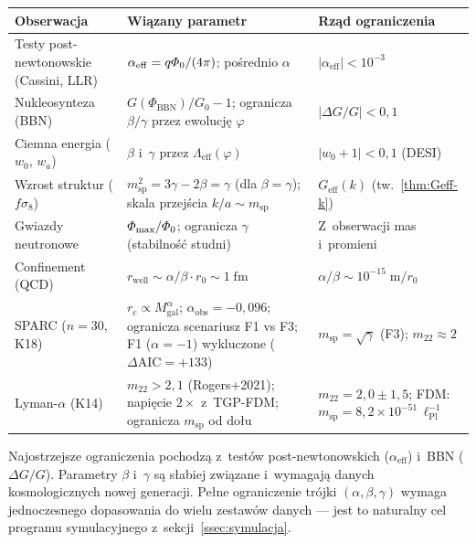 \begin{center}
\small
\begin{tabular}{@{}>{\raggedright}p{3cm}p{7cm}>{\raggedright\arraybackslash}p{3.5cm}@{}}
\toprule
\textbf{Obserwacja} & \textbf{Wi\k{a}zany parametr}
  & \textbf{Rz\k{a}d ograniczenia} \\
\midrule
Testy post-newtonowskie
  (Cassini, LLR)
  & $\alpha_{\mathrm{eff}} = q\varPhi_0/(4\pi)$;
    po\'srednio $\alpha$
  & $|\alpha_{\mathrm{eff}}| < 10^{-3}$ \\[4pt]
Nukleosynteza (BBN)
  & $G(\Phi_{\mathrm{BBN}})/G_0 - 1$;
    ogranicza $\beta/\gamma$ przez ewolucj\k{e} $\varphi$
  & $|\Delta G/G| < 0{,}1$ \\[4pt]
Ciemna energia
  ($w_0$, $w_a$)
  & $\beta$ i~$\gamma$ przez
    $\Lambda_{\mathrm{eff}}(\varphi)$
  & $|w_0 + 1| < 0{,}1$ (DESI) \\[4pt]
Wzrost struktur
  ($f\sigma_8$)
  & $m_{\mathrm{sp}}^2 = 3\gamma - 2\beta = \gamma$
    (dla $\beta = \gamma$);
    skala przej\'scia $k/a \sim m_{\mathrm{sp}}$
  & $G_{\mathrm{eff}}(k)$ (tw.~\ref{thm:Geff-k}) \\[4pt]
Gwiazdy neutronowe
  & $\varPhi_{\mathrm{max}}/\varPhi_0$; ogranicza
    $\gamma$ (stabilno\'s\'c studni)
  & Z~obserwacji mas i~promieni \\[4pt]
Confinement (QCD)
  & $r_{\mathrm{well}} \sim \alpha/\beta \cdot r_0
    \sim 1\;\mathrm{fm}$
  & $\alpha/\beta \sim 10^{-15}\;\mathrm{m}/r_0$ \\[4pt]
SPARC ($n=30$, K18)
  & $r_c \propto M_{\mathrm{gal}}^\alpha$;
    $\alpha_{\mathrm{obs}} = -0{,}096$;
    ogranicza scenariusz F1 vs F3;
    F1 ($\alpha=-1$) wykluczone ($\Delta\mathrm{AIC}=+133$)
  & $m_{\mathrm{sp}} = \sqrt{\gamma}$ (F3); $m_{22} \approx 2$ \\[4pt]
Lyman-$\alpha$ (K14)
  & $m_{22} > 2{,}1$ (Rogers+2021);
    napięcie $2\times$ z~TGP-FDM;
    ogranicza $m_{\mathrm{sp}}$ od do\l{}u
  & $m_{22} = 2{,}0 \pm 1{,}5$;
    FDM: $m_{\mathrm{sp}} = 8{,}2 \times 10^{-51}\,\ell_{\mathrm{Pl}}^{-1}$ \\
\bottomrule
\end{tabular}
\end{center}

\begin{remark}[Hierarchia wi\k{e}z\'ow]
Najostrzejsze ograniczenia pochodz\k{a} z~test\'ow
post-newtonowskich ($\alpha_{\mathrm{eff}}$) i~BBN
($\Delta G/G$). Parametry $\beta$ i~$\gamma$ s\k{a}
s\l{}abiej zwi\k{a}zane i~wymagaj\k{a} danych kosmologicznych
nowej generacji. Pe\l{}ne ograniczenie tr\'ojki
$(\alpha,\beta,\gamma)$ wymaga jednoczesnego dopasowania
do wielu zestaw\'ow danych --- jest to naturalny cel
programu symulacyjnego z~sekcji~\ref{ssec:symulacja}.
\end{remark}




